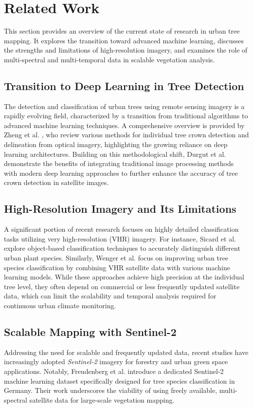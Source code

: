 \section{Related Work}
This section provides an overview of the current state of research in urban tree mapping. It explores the transition toward advanced machine learning, discusses the strengths and limitations of high-resolution imagery, and examines the role of multi-spectral and multi-temporal data in scalable vegetation analysis.

\subsection{Transition to Deep Learning in Tree Detection}
The detection and classification of urban trees using remote sensing imagery is a rapidly evolving field, characterized by a transition from traditional algorithms to advanced machine learning techniques. A comprehensive overview is provided by Zheng et al. \cite{zheng2023reviewindividualtreecrown}, who review various methods for individual tree crown detection and delineation from optical imagery, highlighting the growing reliance on deep learning architectures. Building on this methodological shift, Durgut et al. \cite{durgut2025integrating} demonstrate the benefits of integrating traditional image processing methods with modern deep learning approaches to further enhance the accuracy of tree crown detection in satellite images. 

\subsection{High-Resolution Imagery and Its Limitations}
A significant portion of recent research focuses on highly detailed classification tasks utilizing very high-resolution (VHR) imagery. For instance, Sicard et al. \cite{sicard2023object} explore object-based classification techniques to accurately distinguish different urban plant species. Similarly, Wenger et al. \cite{wenger2024improving} focus on improving urban tree species classification by combining VHR satellite data with various machine learning models. While these approaches achieve high precision at the individual tree level, they often depend on commercial or less frequently updated satellite data, which can limit the scalability and temporal analysis required for continuous urban climate monitoring.

\subsection{Scalable Mapping with Sentinel-2}
Addressing the need for scalable and frequently updated data, recent studies have increasingly adopted \textit{Sentinel-2} imagery for forestry and urban green space applications. Notably, Freudenberg et al. \cite{freudenberg2025sentinel2} introduce a dedicated Sentinel-2 machine learning dataset specifically designed for tree species classification in Germany. Their work underscores the viability of using freely available, multi-spectral satellite data for large-scale vegetation mapping. 

